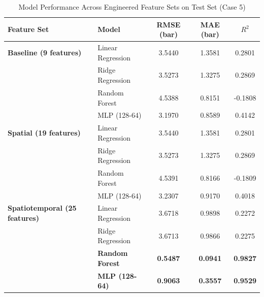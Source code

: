 \begin{table}[h]
\centering
\caption{Model Performance Across Engineered Feature Sets on Test Set (Case 5)}
\label{tab:feature_results}
\begin{tabular}{llccc}
\toprule
\textbf{Feature Set} & \textbf{Model} & \textbf{RMSE (bar)} & \textbf{MAE (bar)} & \textbf{$R^2$} \\
\midrule
\textbf{Baseline (9 features)} 
 & Linear Regression & 3.5440 & 1.3581 & 0.2801 \\
 & Ridge Regression & 3.5273 & 1.3275 & 0.2869 \\
 & Random Forest & 4.5388 & 0.8151 & -0.1808 \\
 & MLP (128-64) & 3.1970 & 0.8589 & 0.4142 \\
\midrule
\textbf{Spatial (19 features)} 
 & Linear Regression & 3.5440 & 1.3581 & 0.2801 \\
 & Ridge Regression & 3.5273 & 1.3275 & 0.2869 \\
 & Random Forest & 4.5391 & 0.8166 & -0.1809 \\
 & MLP (128-64) & 3.2307 & 0.9170 & 0.4018 \\
\midrule
\textbf{Spatiotemporal (25 features)} 
 & Linear Regression & 3.6718 & 0.9898 & 0.2272 \\
 & Ridge Regression & 3.6713 & 0.9866 & 0.2275 \\
 & \textbf{Random Forest} & \textbf{0.5487} & \textbf{0.0941} & \textbf{0.9827} \\
 & \textbf{MLP (128-64)} & \textbf{0.9063} & \textbf{0.3557} & \textbf{0.9529} \\
\bottomrule
\end{tabular}
\end{table}
